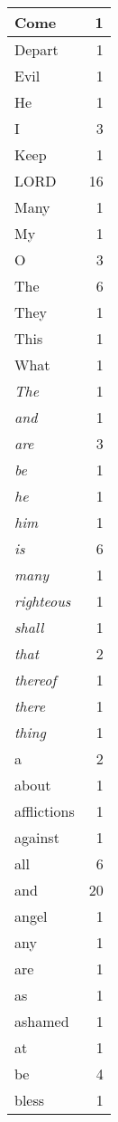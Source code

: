 \begin{center}
\begin{longtable}{l|r}
\hline \hline
\endlastfoot
Come & 1 \\ \hline
Depart & 1 \\ \hline
Evil & 1 \\ \hline
He & 1 \\ \hline
I & 3 \\ \hline
Keep & 1 \\ \hline
LORD & 16 \\ \hline
Many & 1 \\ \hline
My & 1 \\ \hline
O & 3 \\ \hline
The & 6 \\ \hline
They & 1 \\ \hline
This & 1 \\ \hline
What & 1 \\ \hline
\emph{The} & 1 \\ \hline
\emph{and} & 1 \\ \hline
\emph{are} & 3 \\ \hline
\emph{be} & 1 \\ \hline
\emph{he} & 1 \\ \hline
\emph{him} & 1 \\ \hline
\emph{is} & 6 \\ \hline
\emph{many} & 1 \\ \hline
\emph{righteous} & 1 \\ \hline
\emph{shall} & 1 \\ \hline
\emph{that} & 2 \\ \hline
\emph{thereof} & 1 \\ \hline
\emph{there} & 1 \\ \hline
\emph{thing} & 1 \\ \hline
a & 2 \\ \hline
about & 1 \\ \hline
afflictions & 1 \\ \hline
against & 1 \\ \hline
all & 6 \\ \hline
and & 20 \\ \hline
angel & 1 \\ \hline
any & 1 \\ \hline
are & 1 \\ \hline
as & 1 \\ \hline
ashamed & 1 \\ \hline
at & 1 \\ \hline
be & 4 \\ \hline
bless & 1 \\ \hline

\end{longtable}
\end{center}
